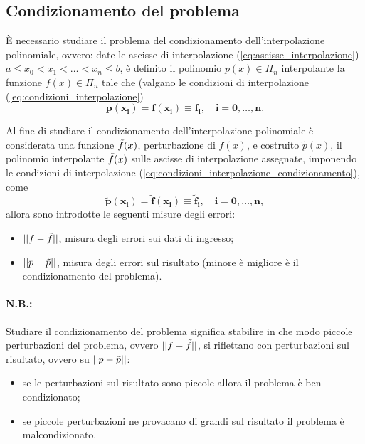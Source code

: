 \subsection{Condizionamento del problema}\label{ssec:condizionamento_problema_approsimazione_funzione}
È necessario studiare il problema del condizionamento dell'interpolazione polinomiale, ovvero: date le ascisse di interpolazione (\ref{eq:ascisse_interpolazione}) $a\leq x_0<x_1<\hdots<x_n\leq b$, è definito il polinomio $p(x)\in\Pi_n$ interpolante la funzione $f(x)\in\Pi_n$ tale che (valgano le condizioni di interpolazione (\ref{eq:condizioni_interpolazione})
\begin{equation}\label{eq:condizioni_interpolazione_condizionamento}
	\boldsymbol{p(x_i)=f(x_i)\equiv f_i},\quad\boldsymbol{i=0,\hdots,n}.
\end{equation}

Al fine di studiare il condizionamento dell'interpolazione polinomiale è considerata una funzione $\Tilde{f}(x)$, perturbazione di $f(x)$, e costruito $\tilde{p}(x)$, il polinomio interpolante $\Tilde{f}(x)$ sulle ascisse di interpolazione assegnate, imponendo le condizioni di interpolazione (\ref{eq:condizioni_interpolazione_condizionamento}), come
\begin{equation}\label{eq:polinomio_interpolante_perturbazione_f}
	\boldsymbol{\tilde{p}(x_i)=\tilde{f}(x_i)\equiv\tilde{f}_i,\quad i=0,\hdots,n},
\end{equation}
allora sono introdotte le seguenti misure degli errori:
\begin{itemize}
	\item $||f-\Tilde{f}||$, misura degli errori sui dati di ingresso;
	\item $||p-\Tilde{p}||$, misura degli errori sul risultato (minore è migliore è il condizionamento del problema).
\end{itemize}

\paragraph{N.B.:} Studiare il condizionamento del problema significa stabilire in che modo piccole perturbazioni del problema, ovvero $||f-\Tilde{f}||$, si riflettano con perturbazioni sul risultato, ovvero su $||p-\Tilde{p}||$:
\begin{itemize}
    \item se le perturbazioni sul risultato sono piccole allora il problema è ben condizionato;
    \item se piccole perturbazioni ne provacano di grandi sul risultato il problema è malcondizionato.
\end{itemize}

